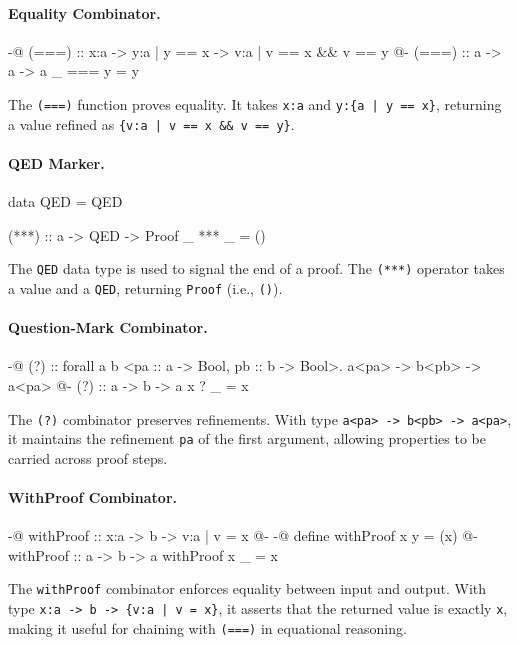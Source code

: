 \paragraph{Equality Combinator.}
\begin{code}[label={lst:proof-eq}]
	{-@ (===) :: x:a -> y:{a | y == x} -> {v:a | v == x && v == y} @-}
	(===) :: a -> a -> a
	_ === y = y
\end{code}
The \texttt{(===)} function proves equality. It takes \texttt{x:a} and \texttt{y:\{a | y == x\}}, returning a value refined as \texttt{\{v:a | v == x \&\& v == y\}}.

\paragraph{QED Marker.}
\begin{code}[label={lst:proof-qed}]
	data QED = QED

	(***) :: a -> QED -> Proof
	_ *** _ = ()
\end{code}
The \texttt{QED} data type is used to signal the end of a proof. The \texttt{(***)} operator takes a value and a \texttt{QED}, returning \texttt{Proof} (i.e., \texttt{()}).

\paragraph{Question-Mark Combinator.}
\begin{code}[label={lst:proof-question}]
	{-@ (?) :: forall a b <pa :: a -> Bool, pb :: b -> Bool>. a<pa> -> b<pb> -> a<pa> @-}
	(?) :: a -> b -> a
	x ? _ = x
\end{code}
The \texttt{(?)} combinator preserves refinements. With type \texttt{a<pa> -> b<pb> -> a<pa>}, it maintains the refinement \texttt{pa} of the first argument, allowing properties to be carried across proof steps.

\paragraph{WithProof Combinator.}
\begin{code}[label={lst:proof-withproof}]
	{-@ withProof :: x:a -> b -> {v:a | v = x} @-}
	{-@ define withProof x y = (x) @-}
	withProof :: a -> b -> a
	withProof x _ = x
\end{code}
The \texttt{withProof} combinator enforces equality between input and output.
With type \texttt{x:a -> b -> \{v:a | v = x\}}, it asserts that the returned value is exactly \texttt{x}, making it useful for chaining with \texttt{(===)} in equational reasoning.

